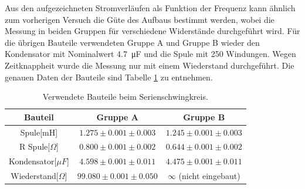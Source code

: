 \documentclass[12pt,a4paper]{article}
\begin{document}
Aus den aufgezeichneten Stromverläufen als Funktion der Frequenz kann ähnlich zum vorherigen Versuch die Güte des Aufbaus bestimmt werden, wobei die Messung in beiden Gruppen für verschiedene Widerstände durchgeführt wird. Für die übrigen Bauteile verwendeten Gruppe A und  Gruppe B wieder den Kondensator mit Nominalwert \SI{4,7}{\micro \F} und die Spule mit 250 Windungen.
Wegen Zeitknappheit wurde die Messung nur mit einem Wiederstand durchgeführt. Die genauen Daten der Bauteile sind Tabelle \ref{tab:parallel_Bauteile} zu entnehmen.

\begin{table}
\centering
\begin{tabular}{|c|c|c|}
\hline
Bauteil & Gruppe A & Gruppe B\\
\hline
Spule[mH] & $1.275\pm 0.001\pm 0.003$ & $1.245\pm 0.001\pm 0.003$\\
\hline
R Spule[$\Omega$] & $0.800\pm 0.001\pm 0.002$ & $0.644\pm 0.001\pm 0.002$\\
\hline
Kondensator[$\mu F$] & $4.598\pm 0.001\pm 0.011$ & $4.475\pm 0.001\pm 0.011$\\
\hline
Wiederstand[$\Omega$] & $99.080\pm 0.001\pm 0.050$ & $\infty$ (nicht eingebaut)\\
\hline
\end{tabular}
\label{tab:parallel_Bauteile}
\caption{Verwendete Bauteile beim Serienschwingkreis.}
\end{table}
\end{document}
